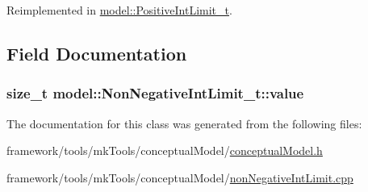 Reimplemented in \hyperlink{structmodel_1_1_positive_int_limit__t_a1cc617b2848ff423d27d0159179ac393}{model\+::\+Positive\+Int\+Limit\+\_\+t}.



\subsection{Field Documentation}
\subsubsection[{\texorpdfstring{value}{value}}]{\setlength{\rightskip}{0pt plus 5cm}size\+\_\+t model\+::\+Non\+Negative\+Int\+Limit\+\_\+t\+::value\hspace{0.3cm}{\ttfamily [protected]}}\hypertarget{classmodel_1_1_non_negative_int_limit__t_aca4f56e8c716086b2bfc9c54dbd22ee7}{}\label{classmodel_1_1_non_negative_int_limit__t_aca4f56e8c716086b2bfc9c54dbd22ee7}


The documentation for this class was generated from the following files\+:\begin{DoxyCompactItemize}
\item 
framework/tools/mk\+Tools/conceptual\+Model/\hyperlink{conceptual_model_8h}{conceptual\+Model.\+h}\item 
framework/tools/mk\+Tools/conceptual\+Model/\hyperlink{non_negative_int_limit_8cpp}{non\+Negative\+Int\+Limit.\+cpp}\end{DoxyCompactItemize}
